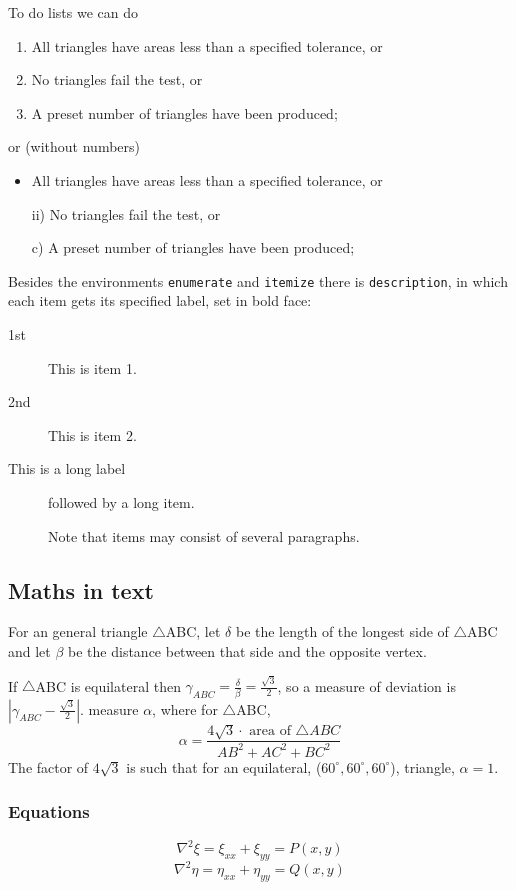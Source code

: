 To do lists we can do
\begin{enumerate}
  \item All triangles have areas less than a specified tolerance, or
  \item No triangles fail the test, or
  \item A preset number of triangles have been produced;
\end{enumerate}  
or (without numbers)
\begin{itemize}
  \item All triangles have areas less than a specified tolerance, or
  \item[ii)] No triangles fail the test, or
  \item[c)] A preset number of triangles have been produced;
\end{itemize}
Besides the environments \texttt{enumerate} and \texttt{itemize} there is
\texttt{description}, in which each item gets its specified label, set in
bold face:
\begin{description}
  \item[1st] This is item 1.
  \item[2nd] This is item 2.
  \item[This is a long label] followed by a long item.

    Note that items may consist of several paragraphs.
\end{description}


\subsection{Maths in text}

For an general triangle $\triangle$ABC, let $\delta$ be the length 
of the longest side of $\triangle$ABC and let $\beta$ be the distance 
between that side and the opposite vertex.

If $\triangle$ABC is equilateral then
$\gamma_{ABC} = \frac{\delta}{\beta} = \frac{\sqrt{3}}{2}$,
so a measure of deviation is
$\left| \gamma_{ABC} - \frac{\sqrt{3}}{2} \right|$.
measure $\alpha$, where for $\triangle$ABC, 
\begin{equation}
  \alpha = \frac{4\sqrt{3} \cdot \text{~area of~} \triangle ABC}
                {AB^2 + AC^2 + BC^2} 
\end{equation}
The factor of $4\sqrt{3}$ is such that for an equilateral,
($60^\circ,60^\circ,60^\circ$), triangle, $\alpha = 1$. 

\subsubsection{Equations}
\begin{equation}
 \nabla^2 \xi = \xi_{xx} + \xi_{yy}   = P(x,y)
\end{equation}
\begin{equation}
 \nabla^2 \eta = \eta_{xx} + \eta_{yy}   = Q(x,y)
\end{equation}

